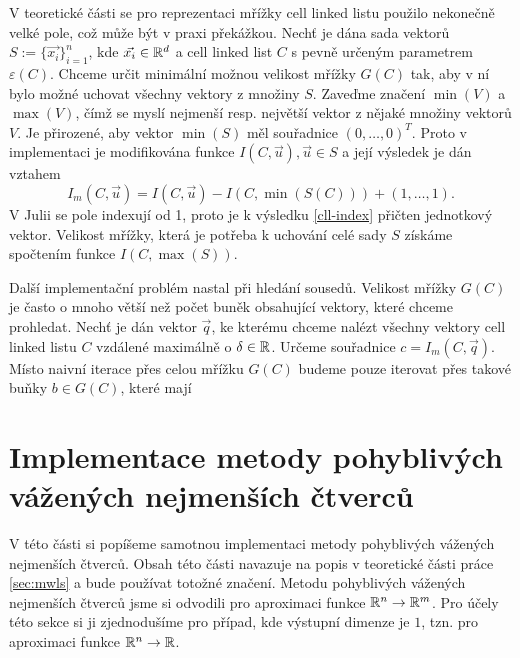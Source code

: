 V teoretické části se pro reprezentaci mřížky cell linked listu použilo nekonečně velké pole, což může být v praxi překážkou. Nechť je dána sada vektorů $S := \{\vec{x_i}\}_{i=1}^n$, kde $\vec{x_i} \in \mathbb{R}^d$ a cell linked list $C$ s pevně určeným parametrem $\varepsilon(C)$. Chceme určit minimální možnou velikost mřížky $G(C)$ tak, aby v ní bylo možné uchovat všechny vektory z množiny $S$. Zaveďme značení $\min(V)$ a $\max(V)$, čímž se myslí nejmenší resp. největší vektor z nějaké množiny vektorů $V$. Je přirozené, aby vektor $\min(S)$ měl souřadnice $(0, \ldots, 0)^T$. Proto v implementaci je modifikována funkce $I(C, \vec{u}), \vec{u} \in S$ a její výsledek je dán vztahem
\begin{equation}
  \label{cll-index}
  I_m(C, \vec{u}) = I(C, \vec{u}) - I(C, \min(S(C))) + (1, \ldots, 1).
\end{equation}
V Julii se pole indexují od 1, proto je k výsledku \ref{cll-index} přičten jednotkový vektor. Velikost mřížky, která je potřeba k uchování celé sady $S$ získáme spočtením funkce $I(C, \max(S))$.

Další implementační problém nastal při hledání sousedů. Velikost mřížky $G(C)$ je často o mnoho větší než počet buněk obsahující vektory, které chceme prohledat. Nechť je dán vektor $\vec{q}$, ke kterému chceme nalézt všechny vektory cell linked listu $C$ vzdálené maximálně o $\delta \in \mathbb{R}$. Určeme souřadnice $c = I_m(C, \vec{q})$. Místo naivní iterace přes celou mřížku $G(C)$ budeme pouze iterovat přes takové buňky $b \in G(C)$, které mají 

\section{Implementace metody pohyblivých vážených nejmenších čtverců}

V této části si popíšeme samotnou implementaci metody pohyblivých vážených nejmenších čtverců. Obsah této části navazuje na popis v teoretické části práce \ref{sec:mwls} a bude používat totožné značení. Metodu pohyblivých vážených nejmenších čtverců jsme si odvodili pro aproximaci funkce $\mathbb{R}^n \rightarrow \mathbb{R}^m$. Pro účely této sekce si ji zjednodušíme pro případ, kde výstupní dimenze je $1$, tzn. pro aproximaci funkce $\mathbb{R}^n \rightarrow \mathbb{R}$. 

